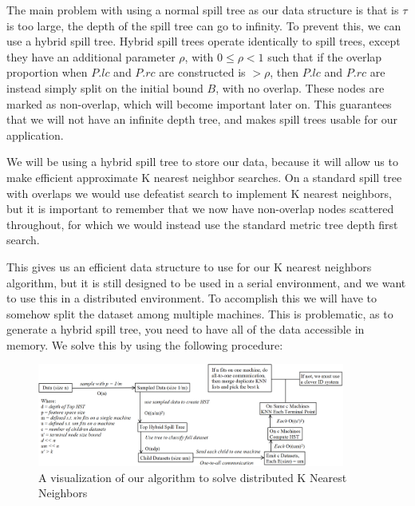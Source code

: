 \vspace{5 mm}
\noindent
The main problem with using a normal spill tree as our data structure is that is
$\tau$ is too large, the depth of the spill tree can go to infinity.  To prevent
this, we can use a hybrid spill tree.  Hybrid spill trees operate identically to
spill trees, except they have an additional parameter $\rho$, with $0 \le \rho <
1$  such that if the overlap proportion when $P.lc$ and $P.rc$ are constructed
is  $> \rho$, then $P.lc$ and $P.rc$ are instead simply split on the initial
bound  $B$, with no overlap.  These nodes are marked as non-overlap, which will
become  important later on.  This guarantees that we will not have an infinite
depth  tree, and makes spill trees usable for our application.

\vspace{5 mm}
\noindent
We will be using a hybrid spill tree to store our data, because it will allow us
to make efficient approximate K nearest neighbor searches.  On a standard spill
tree with overlaps we would use defeatist search to implement K nearest
neighbors,  but it is important to remember that we now have non-overlap nodes
scattered  throughout, for which we would instead use the standard metric tree
depth first search.

\vspace{5 mm}
\noindent
This gives us an efficient data structure to use for our K nearest neighbors
algorithm, but it is still designed to be used in a serial environment, and we
want to use this in a distributed environment.  To accomplish this we will have
to somehow split the dataset among multiple machines.  This is problematic, as
to generate a hybrid spill tree, you need to have all of the data accessible in
memory.  We solve this by using the following procedure:

\hrulefill
\begin{figure}[h]
\centering
\includegraphics[width=0.9\textwidth]{algorithm}
\caption{A visualization of our algorithm to solve distributed K Nearest Neighbors}
\end{figure}
\hrulefill


